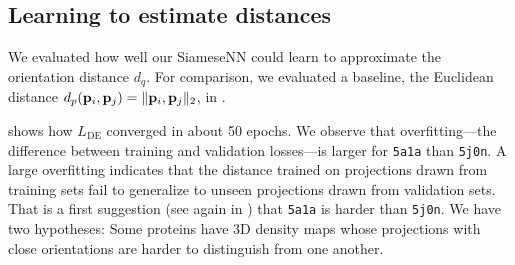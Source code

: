 
\subsection{Learning to estimate distances}\label{sec:results:distance-estimation:learned}



We evaluated how well our SiameseNN could learn  to approximate the orientation distance $d_q$.
For comparison, we evaluated a baseline, the Euclidean distance $d_p(\mathbf{p}_i,\mathbf{p}_j) = \|\mathbf{p}_i, \mathbf{p}_j\|_2$, in .

 shows how $L_\text{DE}$ converged in about 50 epochs.
We observe that overfitting---the difference between training and validation losses---is larger for \texttt{5a1a} than \texttt{5j0n}.
A large overfitting indicates that the distance trained on projections drawn from training sets fail to generalize to unseen projections drawn from validation sets.
That is a first suggestion (see again in ) that \texttt{5a1a} is harder than \texttt{5j0n}.
We have two hypotheses: Some proteins have 3D density maps whose projections with close orientations are harder to distinguish from one another.

